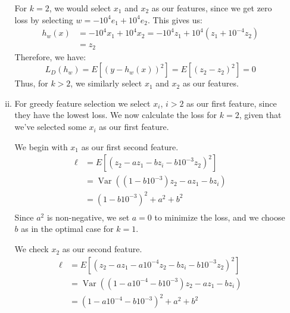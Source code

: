\documentclass{amsart}
\DeclareMathOperator{\Var}{Var}  %
\theoremstyle{definition}
\begin{document}
\begin{enumerate}[(a)]
\begin{enumerate}[i.]
        For $k = 2$, we would select $x_1$ and $x_2$ as our features, since we get zero loss by selecting $w = -10^{4} e_1 + 10^{4} e_2$. 
        This gives us:
        \begin{align*}
          h_w(x) &= -10^{4} x_1 + 10^{4} x_2 = -10^{4} z_1 + 10^{4} (z_1 + 10^{-4} z_2)\\
          &= z_2
        \end{align*}
        Therefore, we have:
        \[L_D(h_w) = E[(y - h_w(x))^2] = E[(z_2 - z_2)^2] = 0\]
        Thus, for $k > 2$, we similarly select $x_1$ and $x_2$ as our features.
      \item 
        For greedy feature selection we select $x_i$, $i > 2$ as our first feature, since they have the lowest loss.
        We now calculate the loss for $k=2$, given that we've selected some $x_i$ as our first feature.

        We begin with $x_1$ as our first second feature.
        \begin{align*}
          \ell &= E[(z_2 - a z_1 - b z_i - b 10^{-3} z_2)^2]\\
          &= \Var((1- b 10^{-3})z_2 - a z_1 - b z_i)\\
          &= (1 - b 10^{-3})^2 + a^2 + b^2\\
        \end{align*}
        Since $a^2$ is non-negative, we set $a = 0$ to minimize the loss, and we choose $b$ as in the optimal case for $k = 1$.
        
        We check $x_2$ as our second feature.
        \begin{align*}
          \ell &= E[(z_2 - a z_1 - a 10^{-4} z_2 - b z_i - b 10^{-3} z_2)^2]\\
          &= \Var((1 - a 10^{-4} - b 10^{-3})z_2 - a z_1 - b z_i)\\
          &= (1 - a 10^{-4} - b 10^{-3})^2 + a^2 + b^2\\
        \end{align*}


\end{enumerate}
\end{enumerate}
\end{document}
